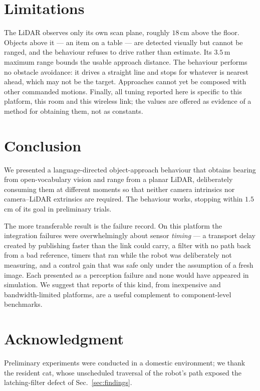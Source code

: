 \documentclass[conference]{IEEEtran}
\begin{document}
\section{Limitations}

The LiDAR observes only its own scan plane, roughly $18$\,cm above the floor.
Objects above it --- an item on a table --- are detected visually but cannot be
ranged, and the behaviour refuses to drive rather than estimate. Its $3.5$\,m
maximum range bounds the usable approach distance. The behaviour performs no
obstacle avoidance: it drives a straight line and stops for whatever is nearest
ahead, which may not be the target. Approaches cannot yet be composed with other
commanded motions. Finally, all tuning reported here is specific to this
platform, this room and this wireless link; the values are offered as evidence
of a method for obtaining them, not as constants.

\section{Conclusion}

We presented a language-directed object-approach behaviour that obtains bearing
from open-vocabulary vision and range from a planar LiDAR, deliberately
consuming them at different moments so that neither camera intrinsics nor
camera--LiDAR extrinsics are required. The behaviour works, stopping within
$1.5$\,cm of its goal in preliminary trials.

The more transferable result is the failure record. On this platform the
integration failures were overwhelmingly about sensor \emph{timing} --- a
transport delay created by publishing faster than the link could carry, a filter
with no path back from a bad reference, timers that ran while the robot was
deliberately not measuring, and a control gain that was safe only under the
assumption of a fresh image. Each presented as a perception failure and none
would have appeared in simulation. We suggest that reports of this kind, from
inexpensive and bandwidth-limited platforms, are a useful complement to
component-level benchmarks.

\section*{Acknowledgment}

Preliminary experiments were conducted in a domestic environment; we thank the
resident cat, whose unscheduled traversal of the robot's path exposed the
latching-filter defect of Sec.~\ref{sec:findings}.
\end{document}
